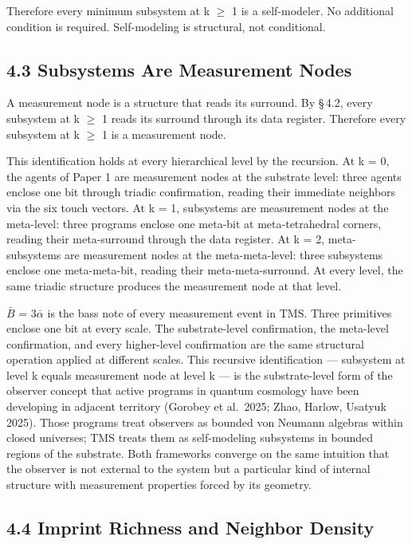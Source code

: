\documentclass[11pt,oneside]{report}
\theoremstyle{definition}
\theoremstyle{remark}
\begin{document}
Therefore every minimum subsystem at k \ensuremath{\geq} 1 is a self-modeler. No
additional condition is required. Self-modeling is structural, not
conditional.

\subsection*{4.3 Subsystems Are Measurement Nodes}

A measurement node is a structure that reads its surround. By \S\,4.2,
every subsystem at k \ensuremath{\geq} 1 reads its surround through its data register.
Therefore every subsystem at k \ensuremath{\geq} 1 is a measurement node.

This identification holds at every hierarchical level by the recursion.
At k = 0, the agents of Paper 1 are measurement nodes at the substrate
level: three agents enclose one bit through triadic confirmation,
reading their immediate neighbors via the six touch vectors. At k = 1,
subsystems are measurement nodes at the meta-level: three programs
enclose one meta-bit at meta-tetrahedral corners, reading their
meta-surround through the data register. At k = 2, meta-subsystems are
measurement nodes at the meta-meta-level: three subsystems enclose one
meta-meta-bit, reading their meta-meta-surround. At every level, the
same triadic structure produces the measurement node at that level.

\ensuremath{\bar{B}} = \ensuremath{3\bar{\alpha}} is the bass note of every measurement event in TMS. Three
primitives enclose one bit at every scale. The substrate-level
confirmation, the meta-level confirmation, and every higher-level
confirmation are the same structural operation applied at different
scales. This recursive identification --- subsystem at level k equals
measurement node at level k --- is the substrate-level form of the
observer concept that active programs in quantum cosmology have been
developing in adjacent territory (Gorobey et al.~2025; Zhao, Harlow,
Usatyuk 2025). Those programs treat observers as bounded von Neumann
algebras within closed universes; TMS treats them as self-modeling
subsystems in bounded regions of the substrate. Both frameworks converge
on the same intuition that the observer is not external to the system
but a particular kind of internal structure with measurement properties
forced by its geometry.

\subsection*{4.4 Imprint Richness and Neighbor Density}
\end{document}
